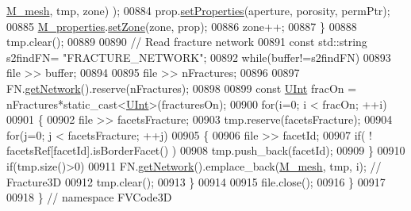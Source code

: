\begin{DoxyCode}
      \hyperlink{classFVCode3D_1_1Importer_a6f1542d6c6ac192e36c8eec7dc366653}{M\_mesh}, tmp, zone) );
00884         prop.\hyperlink{classFVCode3D_1_1Properties_a0ddb477254cfacdb96a440ddedc2548c}{setProperties}(aperture, porosity, permPtr);
00885         \hyperlink{classFVCode3D_1_1Importer_af678e18e971d5a132f5ba494981f6dae}{M\_properties}.\hyperlink{classFVCode3D_1_1PropertiesMap_ac303adadd1101e7bee62ecad0e8ea6ac}{setZone}(zone, prop);
00886         zone++;
00887     \}
00888     tmp.clear();
00889 
00890     \textcolor{comment}{// Read fracture network}
00891     \textcolor{keyword}{const} std::string s2findFN= \textcolor{stringliteral}{"FRACTURE\_NETWORK"};
00892     \textcolor{keywordflow}{while}(buffer!=s2findFN)
00893         file >> buffer;
00894 
00895     file >> nFractures;
00896 
00897     FN.\hyperlink{classFVCode3D_1_1FractureNetwork3D_ad9a40fd0d922b50d29d60e8c4d65f496}{getNetwork}().reserve(nFractures);
00898 
00899     \textcolor{keyword}{const} \hyperlink{namespaceFVCode3D_a4bf7e328c75d0fd504050d040ebe9eda}{UInt} fracOn = nFractures*\textcolor{keyword}{static\_cast<}\hyperlink{namespaceFVCode3D_a4bf7e328c75d0fd504050d040ebe9eda}{UInt}\textcolor{keyword}{>}(fracturesOn);
00900     \textcolor{keywordflow}{for}(i=0; i < fracOn; ++i)
00901     \{
00902         file >> facetsFracture;
00903         tmp.reserve(facetsFracture);
00904         \textcolor{keywordflow}{for}(j=0; j < facetsFracture; ++j)
00905         \{
00906             file >> facetId;
00907             \textcolor{keywordflow}{if}( ! facetsRef[facetId].isBorderFacet() )
00908                 tmp.push\_back(facetId);
00909         \}
00910         \textcolor{keywordflow}{if}(tmp.size()>0)
00911             FN.\hyperlink{classFVCode3D_1_1FractureNetwork3D_ad9a40fd0d922b50d29d60e8c4d65f496}{getNetwork}().emplace\_back(\hyperlink{classFVCode3D_1_1Importer_a6f1542d6c6ac192e36c8eec7dc366653}{M\_mesh}, tmp, i); \textcolor{comment}{// Fracture3D}
00912         tmp.clear();
00913     \}
00914 
00915     file.close();
00916 \}
00917 
00918 \} \textcolor{comment}{// namespace FVCode3D}
\end{DoxyCode}
